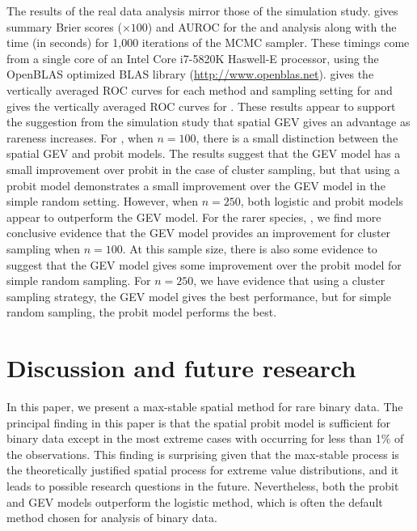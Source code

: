 \documentclass[12pt]{article}
\begin{document}
The results of the real data analysis mirror those of the simulation study.
 gives summary Brier scores ($\times 100$) and AUROC for the \tamarix{} and \hedysarum{} analysis along with the time (in seconds) for 1,000 iterations of the MCMC sampler.
These timings come from a single core of an Intel Core i7-5820K Haswell-E processor, using the OpenBLAS optimized BLAS library (\url{http://www.openblas.net}).
 gives the vertically averaged ROC curves for each method and sampling setting for \tamarix{} and  gives the vertically averaged ROC curves for \hedysarum{}.
These results appear to support the suggestion from the simulation study that spatial GEV gives an advantage as rareness increases.
For \tamarix{}, when $n = 100$, there is a small distinction between the spatial GEV and probit models.
The results suggest that the GEV model has a small improvement over probit in the case of cluster sampling, but that using a probit model demonstrates a small improvement over the GEV model in the simple random setting.
However, when $n = 250$, both logistic and probit models appear to outperform the GEV model.
For the rarer species, \hedysarum{}, we find more conclusive evidence that the GEV model provides an improvement for cluster sampling when $n = 100$.
At this sample size, there is also some evidence to suggest that the GEV model gives some improvement over the probit model for simple random sampling.
For $n = 250$, we have evidence that using a cluster sampling strategy, the GEV model gives the best performance, but for simple random sampling, the probit model performs the best.

\section{Discussion and future research}\label{rbs:conclusions}

In this paper, we present a max-stable spatial method for rare binary data.
The principal finding in this paper is that the spatial probit model is sufficient for binary data except in the most extreme cases with occurring for less than 1\% of the observations.
This finding is surprising given that the max-stable process is the theoretically justified spatial process for extreme value distributions, and it leads to possible research questions in the future.
Nevertheless, both the probit and GEV models  outperform the logistic method, which is often the default method chosen for analysis of binary data.
\end{document}
